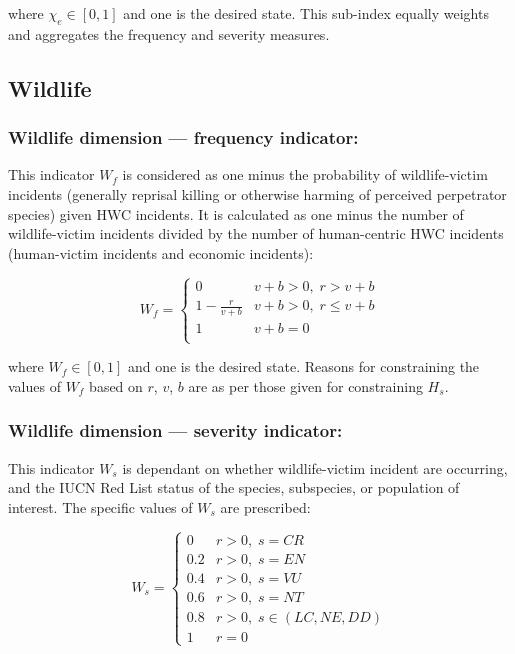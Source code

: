 \documentclass[fleqn,10pt]{olplainarticle}
\begin{document}
where $\chi_e \in [0,1]$ and one is the desired state. This sub-index equally weights and aggregates the frequency and severity measures.

\subsection*{Wildlife}

\subsubsection*{Wildlife dimension --- frequency indicator:}

This indicator $W_f$ is considered as one minus the probability of wildlife-victim incidents (generally reprisal killing or otherwise harming of perceived perpetrator species) given HWC incidents. It is calculated as one minus the number of wildlife-victim incidents divided by the number of human-centric HWC incidents (human-victim incidents and economic incidents):

\begin{equation*}
    W_f = \begin{cases}
    0                   &  v +b > 0,\; r > v +b \\
    1 - \frac{r}{v + b} & v + b > 0,\; r \le v + b \\
    1                   & v + b = 0 \\
    \end{cases}
\end{equation*}

where $W_f \in [0,1]$ and one is the desired state. Reasons for constraining the values of $W_f$ based on $r$, $v$, $b$ are as per those given for constraining $H_s$.

\subsubsection*{Wildlife dimension --- severity indicator:}
This indicator $W_s$ is dependant on whether wildlife-victim incident are occurring, and the IUCN Red List status of the species, subspecies, or population of interest. The specific values of $W_s$ are prescribed:

\begin{equation*}
    W_s = \begin{cases}
    0   & r > 0, \; s = CR \\
    0.2 & r > 0, \; s = EN \\
    0.4 & r > 0, \; s = VU \\
    0.6 & r > 0, \; s = NT \\
    0.8 & r > 0, \; s \in (LC, NE, DD) \\
    1   & r = 0
    \end{cases}
\end{equation*}
\end{document}
